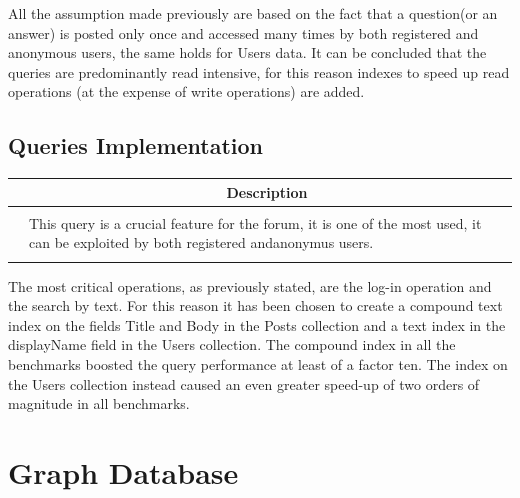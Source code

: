\documentclass[11pt]{report}
\begin{document}
All the assumption made previously are based on the fact that a question(or an answer) is posted only once and accessed many times by both registered and anonymous users, the same holds for Users data. It can be concluded that the queries are predominantly read intensive, for this reason indexes to speed up read operations (at the expense of write operations) are added.

\newpage
\subsection{Queries Implementation}



\begin{table}[H]
\centering
\begin{tabular}{|m{11cm}|m{5cm}|} 
\hline
\rowcolor[rgb]{0.937,0.937,0.937} \multicolumn{1}{|c|}{\textbf{Query}} & \multicolumn{1}{c|}{\textbf{Description}} \\ 
\hline
 & \\ 
\hline
 & This query is a crucial feature for the forum, it is one of the most used, it can be exploited by both registered andanonymus users.  \\
\hline
 &   \\
\hline
\end{tabular}
\end{table}
The most critical operations, as previously stated, are the log-in operation and the search by text. For this reason it has been chosen to create a compound text index on the fields Title and Body in the Posts collection and a text index in the displayName field in the Users collection.
The compound index in all the benchmarks boosted the query performance at least of a factor ten. The index on the Users collection instead caused an even greater speed-up of two orders of magnitude in all benchmarks.
\newpage
\section{Graph Database}
    
\end{document}
